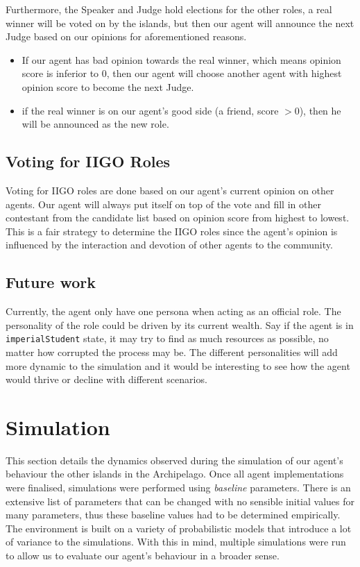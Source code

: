 Furthermore, the Speaker and Judge hold elections for the other roles, a real winner will be voted on by the islands, but then our agent will announce the next Judge based on our opinions for aforementioned reasons.
    \begin{itemize}
        \item If our agent has bad opinion towards the real winner, which means opinion score is inferior to $0$, then our agent will choose another agent with highest opinion score to become the next Judge.
        \item if the real winner is on our agent's good side (a friend, score $> 0$), then he will be announced as the new role.
    \end{itemize}

\subsection{Voting for IIGO Roles}
Voting for IIGO roles are done based on our agent's current opinion on other agents. Our agent will always put itself on top of the vote and fill in other contestant from the candidate list based on opinion score from highest to lowest. This is a fair strategy to determine the IIGO roles since the agent's opinion is influenced by the interaction and devotion of other agents to the community. 

\subsection{Future work}
Currently, the agent only have one persona when acting as an official role. The personality of the role could be driven by its current wealth. Say if the agent is in \texttt{imperialStudent} state, it may try to find as much resources as possible, no matter how corrupted the process may be. The different personalities will add more dynamic to the simulation and it would be interesting to see how the agent would thrive or decline with different scenarios. 
\newpage
\section{Simulation}

This section details the dynamics observed during the simulation of our agent's behaviour the other islands in the Archipelago. Once all agent implementations were finalised, simulations were performed using \textit{baseline} parameters. There is an extensive list of parameters that can be changed with no sensible initial values for many parameters, thus these baseline values had to be determined empirically. The environment is built on a variety of probabilistic models that introduce a lot of variance to the simulations. With this in mind, multiple simulations were run to allow us to evaluate our agent's behaviour in a broader sense.

